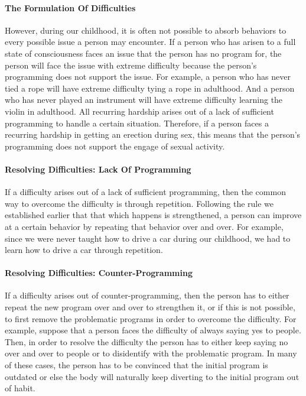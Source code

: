 \documentclass[a4paper, 12pt]{article}
\begin{document}
\paragraph{The Formulation Of Difficulties}
However, during our childhood, it is often not possible to absorb behaviors to every possible issue a person may encounter. If a person who has arisen to a full state of consciousness faces an issue that the person has no program for, the person will face the issue with extreme difficulty because the person's programming does not support the issue. For example, a person who has never tied a rope will have extreme difficulty tying a rope in adulthood. And a person who has never played an instrument will have extreme difficulty learning the violin in adulthood. All recurring hardship arises out of a lack of sufficient programming to handle a certain situation. Therefore, if a person faces a recurring hardship in getting an erection during sex, this means that the person's programming does not support the engage of sexual activity. \\
\paragraph{Resolving Difficulties: Lack Of Programming}
If a difficulty arises out of a lack of sufficient programming, then the common way to overcome the difficulty is through repetition. Following the rule we established earlier that that which happens is strengthened, a person can improve at a certain behavior by repeating that behavior over and over. For example, since we were never taught how to drive a car during our childhood, we had to learn how to drive a car through repetition. \\
\paragraph{Resolving Difficulties: Counter-Programming}
If a difficulty arises out of counter-programming, then the person has to either repeat the new program over and over to strengthen it, or if this is not possible, to first remove the problematic programs in order to overcome the difficulty. For example, suppose that a person faces the difficulty of always saying yes to people. Then, in order to resolve the difficulty the person has to either keep saying no over and over to people or to disidentify with the problematic program. In many of these cases, the person has to be convinced that the initial program is outdated or else the body will naturally keep diverting to the initial program out of habit. \\
\end{document}
